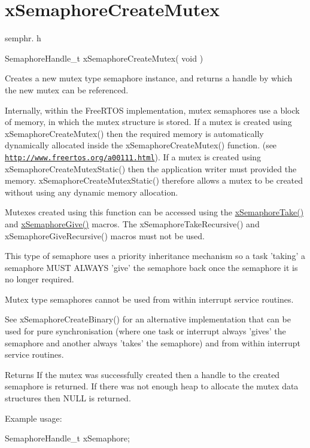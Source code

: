 \hypertarget{group__xSemaphoreCreateMutex}{\section{x\-Semaphore\-Create\-Mutex}
\label{group__xSemaphoreCreateMutex}
}
semphr. h 
\begin{DoxyPre}SemaphoreHandle\_t xSemaphoreCreateMutex( void )\end{DoxyPre}


Creates a new mutex type semaphore instance, and returns a handle by which the new mutex can be referenced.

Internally, within the Free\-R\-T\-O\-S implementation, mutex semaphores use a block of memory, in which the mutex structure is stored. If a mutex is created using x\-Semaphore\-Create\-Mutex() then the required memory is automatically dynamically allocated inside the x\-Semaphore\-Create\-Mutex() function. (see \href{http://www.freertos.org/a00111.html}{\tt http\-://www.\-freertos.\-org/a00111.\-html}). If a mutex is created using x\-Semaphore\-Create\-Mutex\-Static() then the application writer must provided the memory. x\-Semaphore\-Create\-Mutex\-Static() therefore allows a mutex to be created without using any dynamic memory allocation.

Mutexes created using this function can be accessed using the \hyperlink{semphr_8h_af116e436d2a5ae5bd72dbade2b5ea930}{x\-Semaphore\-Take()} and \hyperlink{semphr_8h_aae55761cabfa9bf85c8f4430f78c0953}{x\-Semaphore\-Give()} macros. The x\-Semaphore\-Take\-Recursive() and x\-Semaphore\-Give\-Recursive() macros must not be used.

This type of semaphore uses a priority inheritance mechanism so a task 'taking' a semaphore M\-U\-S\-T A\-L\-W\-A\-Y\-S 'give' the semaphore back once the semaphore it is no longer required.

Mutex type semaphores cannot be used from within interrupt service routines.

See x\-Semaphore\-Create\-Binary() for an alternative implementation that can be used for pure synchronisation (where one task or interrupt always 'gives' the semaphore and another always 'takes' the semaphore) and from within interrupt service routines.

\begin{DoxyReturn}{Returns}
If the mutex was successfully created then a handle to the created semaphore is returned. If there was not enough heap to allocate the mutex data structures then N\-U\-L\-L is returned.
\end{DoxyReturn}
Example usage\-: 
\begin{DoxyPre}
 SemaphoreHandle\_t xSemaphore;\end{DoxyPre}



